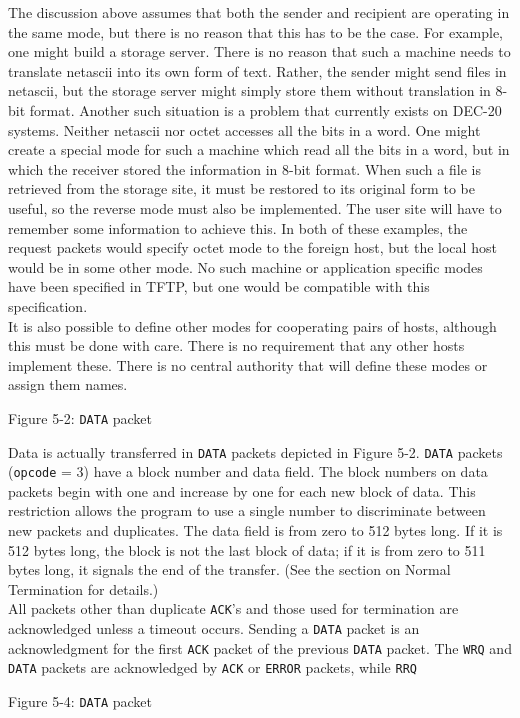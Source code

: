 \documentclass[12pt]{article}
\begin{document}
The discussion above assumes that both the sender and recipient are operating in the same mode, but there is no reason that this has to be the case. For example, one might build a storage server. There is no reason that such a machine needs to translate netascii into its own form of text.  Rather, the sender might send files in netascii, but the storage server might simply store them without translation in 8-bit format. Another such situation is a problem that currently exists on DEC-20 systems. Neither netascii nor octet accesses all the bits in a word. One might create a special mode for such a
machine which read all the bits in a word, but in which the receiver stored the information in 8-bit format. When such a file is retrieved from the storage site, it must be restored to its original form to be useful, so the reverse mode must also be implemented. The user site will have to remember some information to achieve this. In both of these examples, the request packets would specify octet mode to the foreign host, but the local host would be in some other mode. No such machine or application specific modes have been specified in TFTP, but one would be compatible with this specification.\\

It is also possible to define other modes for cooperating pairs of hosts, although this must be done with care. There is no requirement that any other hosts implement these. There is no central authority that will define these modes or assign them names.\\
\begin{center}
Figure 5-2: \verb|DATA| packet
\end{center}

Data is actually transferred in \verb|DATA| packets depicted in Figure 5-2. \verb|DATA| packets (\verb|opcode| = 3) have a block number and data field. The block numbers on data packets begin with one and increase by one for each new block of data.  This restriction allows the program to use a single number to discriminate between new packets and duplicates. The data field is from zero to 512 bytes long. If it is 512 bytes long, the block is not the last block of data; if it is from zero to 511 bytes long, it signals the end of the transfer. (See the section on Normal Termination for details.)\\

All  packets other than duplicate \verb|ACK|'s and those used for termination are acknowledged unless a timeout occurs. Sending a \verb|DATA| packet is an acknowledgment for the first \verb|ACK| packet of the previous \verb|DATA| packet. The \verb|WRQ| and \verb|DATA| packets are acknowledged by \verb|ACK| or \verb|ERROR| packets, while \verb|RRQ|
\begin{center}
Figure 5-4: \verb|DATA| packet
\end{center}
\end{document}

